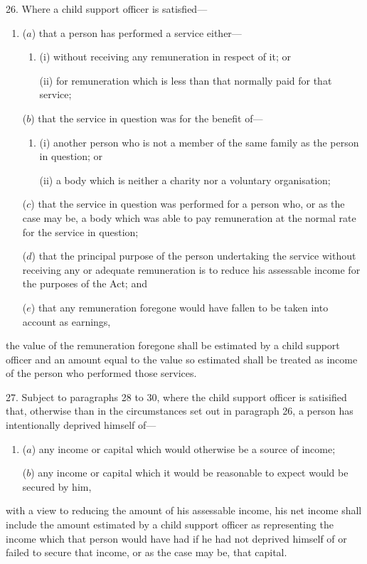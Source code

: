 \documentclass[12pt,a4paper]{article}
\begin{document}
26.  Where a child support officer is satisfied—
\begin{enumerate}\item[]
($a$) that a person has performed a service either—
\begin{enumerate}\item[]
(i) without receiving any remuneration in respect of it; or

(ii) for remuneration which is less than that normally paid for that service;
\end{enumerate}

($b$) that the service in question was for the benefit of—
\begin{enumerate}\item[]
(i) another person who is not a member of the same family as the person in question; or

(ii) a body which is neither a charity nor a voluntary organisation;
\end{enumerate}

($c$) that the service in question was performed for a person who, or as the case may be, a body which was able to pay remuneration at the normal rate for the service in question;

($d$) that the principal purpose of the person undertaking the service without receiving any or adequate remuneration is to reduce his assessable income for the purposes of the Act; and

($e$) that any remuneration foregone would have fallen to be taken into account as earnings,
\end{enumerate}
the value of the remuneration foregone shall be estimated by a child support officer and an amount equal to the value so estimated shall be treated as income of the person who performed those services.

\medskip

27.  Subject to paragraphs 28 to 30, where the child support officer is satisified that, otherwise than in the circumstances set out in paragraph 26, a person has intentionally deprived himself of—
\begin{enumerate}\item[]
($a$) any income or capital which would otherwise be a source of income;

($b$) any income or capital which it would be reasonable to expect would be secured by him,
\end{enumerate}
with a view to reducing the amount of his assessable income, his net income shall include the amount estimated by a child support officer as representing the income which that person would have had if he had not deprived himself of or failed to secure that income, or as the case may be, that capital.
\end{document}
